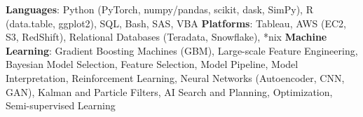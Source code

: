

\begin{cvparagraph}
{\textbf{Languages}: Python (PyTorch, numpy/pandas, scikit, dask, SimPy), R (data.table, ggplot2), SQL, Bash, SAS, VBA}\newline
{\textbf{Platforms}: Tableau, AWS (EC2, S3, RedShift), Relational Databases (Teradata, Snowflake), *nix}\newline
{\textbf{Machine Learning}: Gradient Boosting Machines (GBM), Large-scale Feature Engineering, Bayesian Model Selection, Feature Selection, Model Pipeline, Model Interpretation, Reinforcement Learning, Neural Networks (Autoencoder, CNN, GAN), Kalman and Particle Filters, AI Search and Planning, Optimization, Semi-supervised Learning}\newline
\end{cvparagraph}
